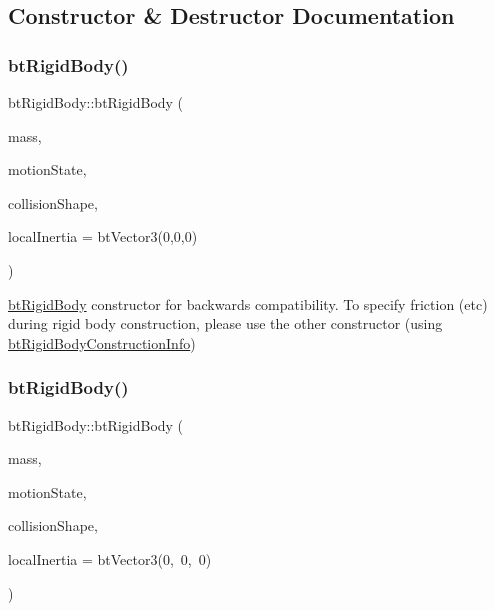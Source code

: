 \subsection{Constructor \& Destructor Documentation}
\mbox{\label{classbtRigidBody_aac9b7d050bc87644d38e9ffe4fe4c5ab}} 
\subsubsection{\texorpdfstring{bt\+Rigid\+Body()}{btRigidBody()}\hspace{0.1cm}{\footnotesize\ttfamily [1/2]}}
{\footnotesize\ttfamily bt\+Rigid\+Body\+::bt\+Rigid\+Body (\begin{DoxyParamCaption}\item[{bt\+Scalar}]{mass,  }\item[{\hyperlink{classbtMotionState}{bt\+Motion\+State} $\ast$}]{motion\+State,  }\item[{bt\+Collision\+Shape $\ast$}]{collision\+Shape,  }\item[{const bt\+Vector3 \&}]{local\+Inertia = {\ttfamily btVector3(0,0,0)} }\end{DoxyParamCaption})}

\hyperlink{classbtRigidBody}{bt\+Rigid\+Body} constructor for backwards compatibility. To specify friction (etc) during rigid body construction, please use the other constructor (using \hyperlink{structbtRigidBody_1_1btRigidBodyConstructionInfo}{bt\+Rigid\+Body\+Construction\+Info}) \mbox{\label{classbtRigidBody_aac9b7d050bc87644d38e9ffe4fe4c5ab}} 
\subsubsection{\texorpdfstring{bt\+Rigid\+Body()}{btRigidBody()}\hspace{0.1cm}{\footnotesize\ttfamily [2/2]}}
{\footnotesize\ttfamily bt\+Rigid\+Body\+::bt\+Rigid\+Body (\begin{DoxyParamCaption}\item[{bt\+Scalar}]{mass,  }\item[{\hyperlink{classbtMotionState}{bt\+Motion\+State} $\ast$}]{motion\+State,  }\item[{bt\+Collision\+Shape $\ast$}]{collision\+Shape,  }\item[{const bt\+Vector3 \&}]{local\+Inertia = {\ttfamily btVector3(0,~0,~0)} }\end{DoxyParamCaption})}

